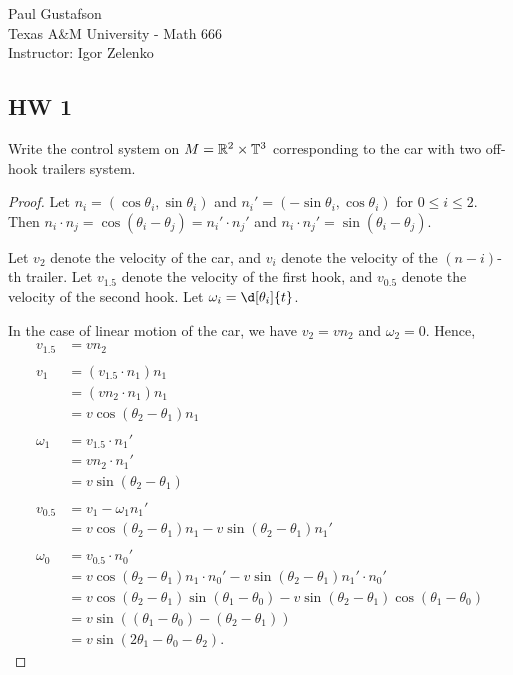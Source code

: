 \documentclass{article}
\begin{document}
\noindent Paul Gustafson\\
\noindent Texas A\&M University - Math 666\\ 
\noindent Instructor: Igor Zelenko

\subsection*{HW 1}
  Write the control system on $M = \mathbb{R}^2 \times \mathbb{T}^3$ corresponding to the car with two off-hook trailers system.
\begin{proof}
Let $n_i = (\cos \theta_i, \sin \theta_i)$ and $n_i' = (-\sin \theta_i , \cos \theta_i)$ for $0 \le i \le 2$.
Then $n_i \cdot n_j  = \cos(\theta_i - \theta_j) = n_i' \cdot n_j'$ and $n_i \cdot n_j' = \sin(\theta_i - \theta_j)$.

Let $v_2$ denote the velocity of the car, and $v_i$ denote the velocity of the $(n-i)$-th trailer. Let $v_{1.5}$ denote the velocity of the first hook, and $v_{0.5}$ denote the velocity of the second hook. Let $\omega_i = \d[\theta_i]{t}$.  


In the case of linear motion of the car, we have $v_2 = v n_2$ and $\omega_2 = 0$. Hence,
\begin{align*}
v_{1.5} & = v n_2
\\
\\ v_1 & = (v_{1.5} \cdot n_1) n_1 
\\ & = (v n_2 \cdot n_1) n_1 
\\ & = v \cos(\theta_2 - \theta_1) n_1
\\
\\ \omega_1 & = v_{1.5} \cdot n_1' 
\\ & = v n_2 \cdot n_1' 
\\ & = v \sin(\theta_2 - \theta_1)
\\
\\ v_{0.5} & = v_1  - \omega_1 n_1' 
\\ & = v \cos(\theta_2 - \theta_1) n_1 - v \sin(\theta_2 - \theta_1) n_1'
\\
\\ \omega_0 & = v_{0.5} \cdot n_0'
\\ & = v \cos(\theta_2 - \theta_1) n_1 \cdot n_0' - v \sin(\theta_2 - \theta_1) n_1' \cdot n_0'
\\ &  = v \cos(\theta_2 - \theta_1) \sin(\theta_1 - \theta_0) - v \sin(\theta_2 - \theta_1) \cos(\theta_1 - \theta_0)
\\ &  = v \sin((\theta_1 - \theta_0) - (\theta_2 - \theta_1))
\\ &  = v \sin(2 \theta_1 - \theta_0 - \theta_2 ).
\end{align*}


\end{proof}
\end{document}

